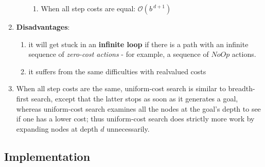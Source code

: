 \begin{enumerate}[itemsep=0.2cm]
\begin{enumerate}[itemsep=0.2cm]
\begin{enumerate}[itemsep=0.2cm]
            \item When all step costs are equal: $\mathcal{O}(b^{\ d+1})$
            \hfill \cite{ai/book/Artificial-Intelligence-A-Modern-Approach/Russell-Norvig}
        \end{enumerate}
    \end{enumerate}

    \item \textbf{Disadvantages}:
    \begin{enumerate}[itemsep=0.2cm]
        \item it will get stuck in an \textbf{infinite loop} if there is a path with an infinite sequence of \textit{zero-cost actions} - for example, a sequence of $NoOp$ actions.
        \hfill \cite{ai/book/Artificial-Intelligence-A-Modern-Approach/Russell-Norvig}

        \item  it suffers from the same difficulties with realvalued costs
        \hfill \cite{ai/book/Artificial-Intelligence-A-Modern-Approach/Russell-Norvig}
    \end{enumerate}

    \item When all step costs are the same, uniform-cost search is similar to breadth-first search, except that the latter stops as soon as it generates a goal, whereas uniform-cost search examines all the nodes at the goal’s depth to see if one has a lower cost; thus uniform-cost search does strictly more work by expanding nodes at depth $d$ unnecessarily.
    \hfill \cite{ai/book/Artificial-Intelligence-A-Modern-Approach/Russell-Norvig}
\end{enumerate}




\subsection*{Implementation}

